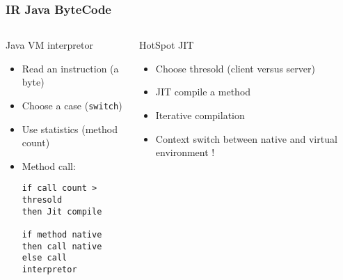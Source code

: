 %
\begin{frame}[fragile]\frametitle{IR Java ByteCode}
  \begin{columns}[t]
    \begin{column}{5cm} %
      \begin{block}{Java VM interpretor}
        \begin{itemize}
        \item Read an instruction (a byte)
        \item Choose a case (\texttt{switch})
        \item Use statistics (method count)
        \item Method call:
\begin{verbatim}
if call count > thresold 
then Jit compile

if method native
then call native
else call interpretor
\end{verbatim}
        \end{itemize}
      \end{block} 
    \end{column}
    
    \begin{column}{5cm} %
      \begin{block}{HotSpot JIT}
        \begin{itemize}
        \item Choose thresold (client versus server)\TBD
        \item JIT compile a method
        \item Iterative compilation
        \item Context switch between native and virtual environment !
        \end{itemize}
      \end{block}   
    \end{column}
  \end{columns}  
\end{frame}


